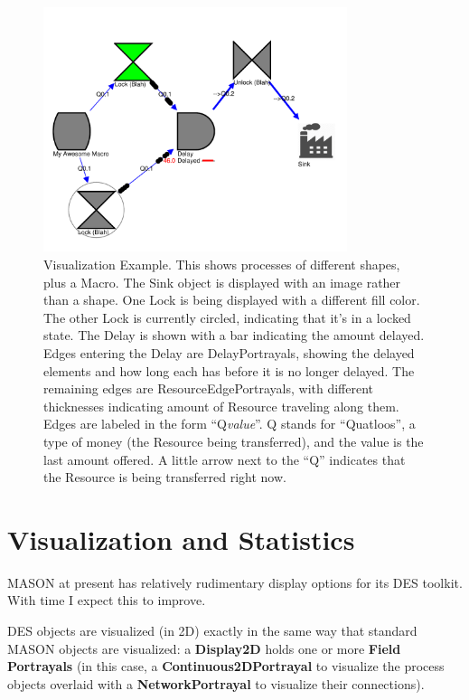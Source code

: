 \documentclass[twoside,10pt]{article}
\begin{document}
\begin{figure}
\vspace{-3em}\includegraphics[width=3.5in]{Visualization.pdf}
\vspace{-2em}
\caption{Visualization Example.  This shows processes of different shapes, plus a Macro.  The Sink object is displayed with an image rather than a shape.  One Lock is being displayed with a different fill color.  The other Lock is currently circled, indicating that it's in a locked state.  The Delay is shown with a bar indicating the amount delayed.  Edges entering the Delay are DelayPortrayals, showing the delayed elements and how long each has before it is no longer delayed.  The remaining edges are ResourceEdgePortrayals, with different thicknesses indicating amount of Resource traveling along them.  Edges are labeled in the form ``Q{\it value}''.  Q stands for ``Quatloos'', a type of money (the Resource being transferred), and the value is the last amount offered.  A little arrow next to the ``Q'' indicates that the Resource is being transferred right now.}
\label{visualization}
\end{figure}

\section{Visualization and Statistics}

MASON at present has relatively rudimentary display options for its DES toolkit.  With time I expect this to improve.

DES objects are visualized (in 2D) exactly in the same way that standard MASON objects are visualized: a {\bf Display2D} holds one or more {\bf Field Portrayals} (in this case, a {\bf Continuous2DPortrayal} to visualize the process objects overlaid with a {\bf NetworkPortrayal} to visualize their connections).  
\end{document}
